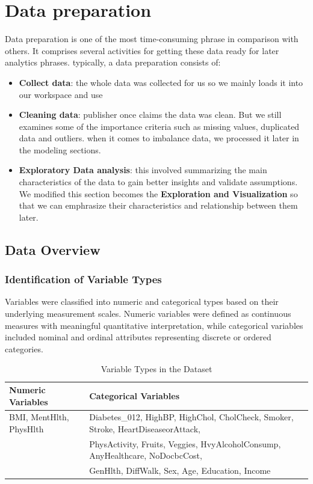 \section{Data preparation}

Data preparation is one of the most time-consuming phrase in comparison with others.
It comprises several activities for getting these data ready for later analytics phrases.
typically, a data preparation consists of:
\begin{itemize}
    \item \textbf{Collect data}: the whole data was collected for us so we mainly loads it into our workspace and use
    \item \textbf{Cleaning data}: publisher once claims the data was clean. But we still examines some of the importance criteria such as missing values, duplicated data and outliers.
    when it comes to imbalance data, we processed it later in the modeling sections.
    \item \textbf{Exploratory Data analysis}: this involved 
    summarizing the main characteristics of the data to gain better insights and 
    validate assumptions. We modified this section becomes the \textbf{Exploration and Visualization}
    so that we can emphrasize their characteristics and relationship between them later.
\end{itemize}


\subsection{Data Overview}

\subsubsection{Identification of Variable Types}

Variables were classified into numeric and categorical types based on their underlying measurement scales. Numeric variables were defined as continuous measures with meaningful quantitative interpretation, while categorical variables included nominal and ordinal attributes representing discrete or ordered categories.

\begin{table}[H]
\centering
\caption{Variable Types in the Dataset}
\begin{tabular}{p{6cm}|p{9cm}}
\hline
\textbf{Numeric Variables} & \textbf{Categorical Variables} \\
\hline
BMI, MentHlth, PhysHlth &
Diabetes\_012, HighBP, HighChol, CholCheck, Smoker, Stroke, HeartDiseaseorAttack, \\
& PhysActivity, Fruits, Veggies, HvyAlcoholConsump, AnyHealthcare, NoDocbcCost, \\
& GenHlth, DiffWalk, Sex, Age, Education, Income \\
\hline
\end{tabular}
\end{table}

